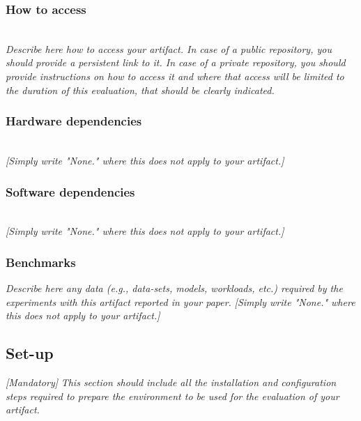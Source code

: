\subsubsection{How to access}\\
\textit{Describe here how to access your artifact. In case of a public repository, you should provide a persistent link to it. In case of a private repository, you should provide instructions on how to access it and where that access will be limited to the duration of this evaluation, that should be clearly indicated.\\}

\subsubsection{Hardware dependencies}\\
\textit{[Simply write "None." where this does not apply to your artifact.]}

\subsubsection{Software dependencies}\\ 
\textit{[Simply write "None." where this does not apply to your artifact.]}

\subsubsection{Benchmarks} 
\textit{Describe here any data (e.g., data-sets, models, workloads, etc.) required by the experiments with this artifact reported in your paper.} \textit{[Simply write "None." where this does not apply to your artifact.]}

\subsection{Set-up}

{\em [Mandatory]} \textit{This section should include all the installation and configuration steps required to prepare the environment to be used for the evaluation of your artifact.}

